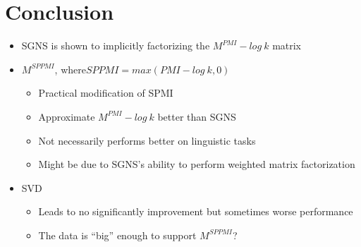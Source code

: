 \documentclass[compress]{beamer}
\begin{document}
\section{Conclusion}
\begin{frame}{\secname}
\begin{itemize}
    \item SGNS is shown to implicitly factorizing the $M^{PMI}-log~k$ matrix
    \item $M^{SPPMI}$, where$SPPMI=max(PMI-log~k,0)$
    \begin{itemize}
        \item Practical modification of SPMI
        \item Approximate $M^{PMI}-log~k$ better than SGNS
        \item Not necessarily performs better on linguistic tasks
        \item Might be due to SGNS's ability to perform weighted matrix factorization
    \end{itemize}
    \item SVD 
    \begin{itemize}
        \item Leads to no significantly improvement but sometimes worse performance
        \item The data is ``big'' enough to support $M^{SPPMI}$?
    \end{itemize}
    
\end{itemize}
\end{frame}
\end{document}
